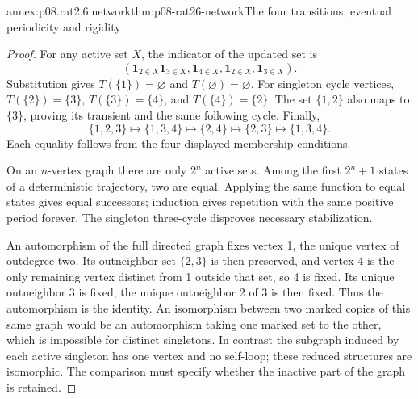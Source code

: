 \begin{annexitem}{annex:p08.rat2.6.network}{thm:p08-rat26-network}{The four transitions, eventual periodicity and rigidity}
\begin{proof}
For any active set \(X\), the indicator of the updated set is
\[
 (\mathbf1_{2\in X}\mathbf1_{3\in X},
   \mathbf1_{4\in X},\mathbf1_{2\in X},\mathbf1_{3\in X}).
\]
Substitution gives \(T(\{1\})=\varnothing\) and
\(T(\varnothing)=\varnothing\). For singleton cycle vertices,
\(T(\{2\})=\{3\}\), \(T(\{3\})=\{4\}\), and
\(T(\{4\})=\{2\}\). The set \(\{1,2\}\) also maps to
\(\{3\}\), proving its transient and the same following cycle.
Finally,
\[
 \{1,2,3\}\mapsto\{1,3,4\}\mapsto\{2,4\}
 \mapsto\{2,3\}\mapsto\{1,3,4\}.
\]
Each equality follows from the four displayed membership conditions.

On an \(n\)-vertex graph there are only \(2^n\) active sets.
Among the first \(2^n+1\) states of a deterministic trajectory,
two are equal. Applying the same function to equal states gives equal
successors; induction gives repetition with the same positive period
forever. The singleton three-cycle disproves necessary stabilization.

An automorphism of the full directed graph fixes vertex 1, the unique
vertex of outdegree two. Its outneighbor set \(\{2,3\}\) is then
preserved, and vertex 4 is the only remaining vertex distinct from 1
outside that set, so 4 is fixed. Its unique outneighbor 3 is fixed;
the unique outneighbor 2 of 3 is then fixed. Thus the automorphism
is the identity. An isomorphism between two marked copies of this
same graph would be an automorphism taking one marked set to the
other, which is impossible for distinct singletons. In contrast the
subgraph induced by each active singleton has one vertex and no
self-loop; these reduced structures are isomorphic. The comparison
must specify whether the inactive part of the graph is retained.
\end{proof}
\end{annexitem}

